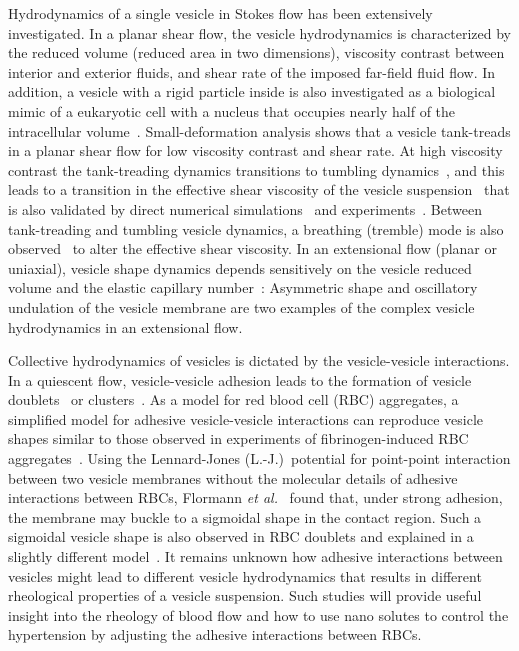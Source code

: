 \documentclass[prf,superscriptaddress,showkeys]{revtex4-1}
\begin{document}
Hydrodynamics of a single vesicle in Stokes flow has been extensively
investigated. In a planar shear flow, the vesicle hydrodynamics is
characterized by the reduced volume (reduced area in two dimensions),
viscosity contrast between interior and exterior fluids, and shear rate
of the imposed far-field fluid flow. In addition, a vesicle with a rigid
particle inside is also investigated as a biological mimic of a
eukaryotic cell with a nucleus that occupies nearly half of the
intracellular volume~\cite{Veerapaneni2011_PRL}. Small-deformation
analysis shows that a vesicle tank-treads in a planar shear flow for low
viscosity contrast and shear rate. At high viscosity contrast the
tank-treading dynamics transitions to tumbling
dynamics~\cite{Misbah2006_PRL, Vlahovska2007_PRE}, and this leads to a
transition in the effective shear viscosity of the vesicle
suspension~\cite{Misbah2006_PRL,Vitkova2008_BJ} that is also validated
by direct numerical simulations~\cite{GhigliottiBibenMisbah2010_JFM} and
experiments~\cite{Vitkova2008_BJ,DeschampsKantsler2009_PNAS,
KantslerSegreSteinberg2008_EPL, ZabuskySegreDeschamps2011_PoF}.  Between
tank-treading and tumbling vesicle dynamics, a breathing (tremble) mode
is also observed~\cite{Misbah2006_PRL, KantslerSegreSteinberg2008_PRL,
ZhaoShaqfeh2011_JFM, SpannZhaoShaqfeh2014_PoF} to alter the effective
shear viscosity.  In an extensional flow (planar or uniaxial), vesicle
shape dynamics depends sensitively on the vesicle reduced volume and the
elastic capillary number~\cite{KantslerSegreSteinberg2008_PRL,
ZhaoShaqfeh2013_JFM, Narsimhan2014_JFM,
DahlNarsimhanGouveia2016_SoftMatt}: Asymmetric shape and oscillatory
undulation of the vesicle membrane are two examples of the complex
vesicle hydrodynamics in an extensional flow.

Collective hydrodynamics of vesicles is dictated by the vesicle-vesicle
interactions.  In a quiescent flow, vesicle-vesicle adhesion leads to
the formation of vesicle doublets~\cite{Ziherl2007_PRL,
ZiherlSvetina2007_PNAS} or
clusters~\cite{SvetinaZiherl2008_Bioelectrochemistry,
FlormannAouane2017_SciReports}.  As a model for red blood cell (RBC)
aggregates, a simplified model for adhesive vesicle-vesicle interactions
can reproduce vesicle shapes similar to those observed in
experiments of fibrinogen-induced RBC
aggregates~\cite{SvetinaZiherl2008_Bioelectrochemistry,
FlormannAouane2017_SciReports}.  Using the Lennard-Jones
(L.-J.)~potential for point-point interaction between two vesicle
membranes without the molecular details of adhesive interactions between
RBCs, Flormann {\em et al.}~\cite{FlormannAouane2017_SciReports} found
that, under strong adhesion, 
the membrane may buckle to a sigmoidal shape in the contact region.
Such a sigmoidal vesicle shape is 
also observed in RBC doublets and explained in a slightly different
model~\cite{ZiherlSvetina2007_PNAS}.  It remains unknown how adhesive
interactions between vesicles might lead to different vesicle
hydrodynamics that results in different rheological properties of a
vesicle suspension. Such studies will provide useful insight into the
rheology of blood flow and how to use nano solutes to control the
hypertension by adjusting the adhesive interactions between RBCs.
\end{document}
